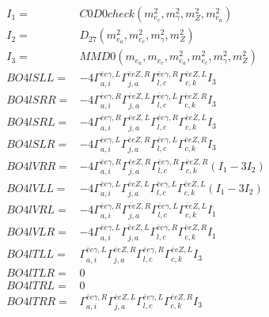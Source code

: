\documentclass[A4,landscape]{article}
\begin{document}
\begin{align} 
I_1 = & C0D0check(m^2_{e_{{c}}}, m^2_{\gamma}, m^2_{Z}, m^2_{e_{{a}}}) \\ 
I_2 = & D_{27}(m^2_{e_{{a}}}, m^2_{e_{{c}}}, m^2_{\gamma}, m^2_{Z}) \\ 
I_3 = & MMD0(m_{e_{{a}}}, m_{e_{{c}}}, m^2_{e_{{a}}}, m^2_{e_{{c}}}, m^2_{\gamma}, m^2_{Z}) \\ 
  BO4lSLL= & -4  \Gamma^{\bar{e}e \gamma ,L}_{a, i} \Gamma^{\bar{e}e Z ,R}_{j, a} \Gamma^{\bar{e}e \gamma ,R}_{l, c} \Gamma^{\bar{e}e Z ,L}_{c, k} I_3 \\ 
  BO4lSRR= & -4  \Gamma^{\bar{e}e \gamma ,R}_{a, i} \Gamma^{\bar{e}e Z ,L}_{j, a} \Gamma^{\bar{e}e \gamma ,L}_{l, c} \Gamma^{\bar{e}e Z ,R}_{c, k} I_3 \\ 
  BO4lSRL= & -4  \Gamma^{\bar{e}e \gamma ,R}_{a, i} \Gamma^{\bar{e}e Z ,L}_{j, a} \Gamma^{\bar{e}e \gamma ,R}_{l, c} \Gamma^{\bar{e}e Z ,L}_{c, k} I_3 \\ 
  BO4lSLR= & -4  \Gamma^{\bar{e}e \gamma ,L}_{a, i} \Gamma^{\bar{e}e Z ,R}_{j, a} \Gamma^{\bar{e}e \gamma ,L}_{l, c} \Gamma^{\bar{e}e Z ,R}_{c, k} I_3 \\ 
  BO4lVRR= & -4  \Gamma^{\bar{e}e \gamma ,R}_{a, i} \Gamma^{\bar{e}e Z ,R}_{j, a} \Gamma^{\bar{e}e \gamma ,R}_{l, c} \Gamma^{\bar{e}e Z ,R}_{c, k} (I_1 - 3 I_2) \\ 
  BO4lVLL= & -4  \Gamma^{\bar{e}e \gamma ,L}_{a, i} \Gamma^{\bar{e}e Z ,L}_{j, a} \Gamma^{\bar{e}e \gamma ,L}_{l, c} \Gamma^{\bar{e}e Z ,L}_{c, k} (I_1 - 3 I_2) \\ 
  BO4lVRL= & -4  \Gamma^{\bar{e}e \gamma ,R}_{a, i} \Gamma^{\bar{e}e Z ,R}_{j, a} \Gamma^{\bar{e}e \gamma ,L}_{l, c} \Gamma^{\bar{e}e Z ,L}_{c, k} I_1 \\ 
  BO4lVLR= & -4  \Gamma^{\bar{e}e \gamma ,L}_{a, i} \Gamma^{\bar{e}e Z ,L}_{j, a} \Gamma^{\bar{e}e \gamma ,R}_{l, c} \Gamma^{\bar{e}e Z ,R}_{c, k} I_1 \\ 
  BO4lTLL= &  \Gamma^{\bar{e}e \gamma ,L}_{a, i} \Gamma^{\bar{e}e Z ,R}_{j, a} \Gamma^{\bar{e}e \gamma ,R}_{l, c} \Gamma^{\bar{e}e Z ,L}_{c, k} I_3 \\ 
  BO4lTLR= & 0 \\ 
  BO4lTRL= & 0 \\ 
  BO4lTRR= &  \Gamma^{\bar{e}e \gamma ,R}_{a, i} \Gamma^{\bar{e}e Z ,L}_{j, a} \Gamma^{\bar{e}e \gamma ,L}_{l, c} \Gamma^{\bar{e}e Z ,R}_{c, k} I_3 \\ 
\end{align} 
\end{document}

